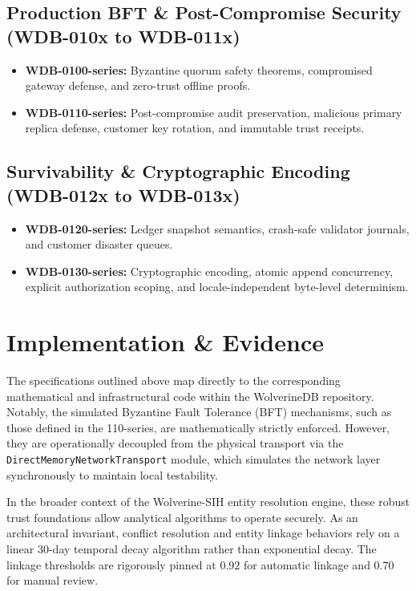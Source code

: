 \subsection{Production BFT \& Post-Compromise Security (WDB-010x to WDB-011x)}
\begin{itemize}
    \item \textbf{WDB-0100-series:} Byzantine quorum safety theorems, compromised gateway defense, and zero-trust offline proofs.
    \item \textbf{WDB-0110-series:} Post-compromise audit preservation, malicious primary replica defense, customer key rotation, and immutable trust receipts.
\end{itemize}

\subsection{Survivability \& Cryptographic Encoding (WDB-012x to WDB-013x)}
\begin{itemize}
    \item \textbf{WDB-0120-series:} Ledger snapshot semantics, crash-safe validator journals, and customer disaster queues.
    \item \textbf{WDB-0130-series:} Cryptographic encoding, atomic append concurrency, explicit authorization scoping, and locale-independent byte-level determinism.
\end{itemize}

\section{Implementation \& Evidence}

The specifications outlined above map directly to the corresponding mathematical and infrastructural code within the WolverineDB repository. Notably, the simulated Byzantine Fault Tolerance (BFT) mechanisms, such as those defined in the 110-series, are mathematically strictly enforced. However, they are operationally decoupled from the physical transport via the \texttt{DirectMemoryNetworkTransport} module, which simulates the network layer synchronously to maintain local testability.

In the broader context of the Wolverine-SIH entity resolution engine, these robust trust foundations allow analytical algorithms to operate securely. As an architectural invariant, conflict resolution and entity linkage behaviors rely on a linear 30-day temporal decay algorithm rather than exponential decay. The linkage thresholds are rigorously pinned at $0.92$ for automatic linkage and $0.70$ for manual review.

